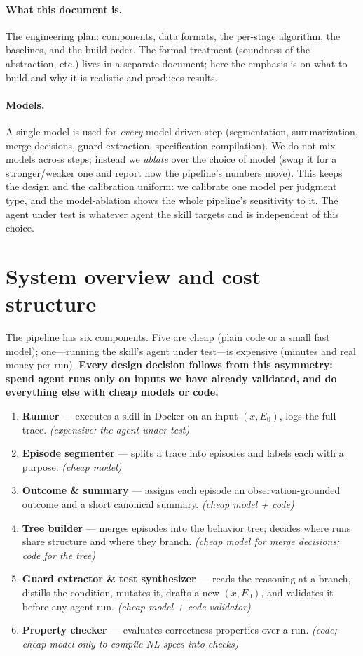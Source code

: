 \documentclass[11pt]{article}
\begin{document}
\paragraph{What this document is.} The engineering plan: components, data
formats, the per-stage algorithm, the baselines, and the build order. The formal
treatment (soundness of the abstraction, etc.) lives in a separate document; here
the emphasis is on what to build and why it is realistic and produces results.

\paragraph{Models.} A single model is used for \emph{every} model-driven step
(segmentation, summarization, merge decisions, guard extraction, specification
compilation). We do not mix models across steps; instead we \emph{ablate} over
the choice of model (swap it for a stronger/weaker one and report how the
pipeline's numbers move). This keeps the design and the calibration uniform: we
calibrate one model per judgment type, and the model-ablation shows the whole
pipeline's sensitivity to it. The agent under test is whatever agent the skill
targets and is independent of this choice.

\section{System overview and cost structure}

The pipeline has six components. Five are cheap (plain code or a small fast
model); one---running the skill's agent under test---is expensive (minutes and
real money per run). \textbf{Every design decision follows from this asymmetry:
spend agent runs only on inputs we have already validated, and do everything else
with cheap models or code.}

\begin{enumerate}[leftmargin=1.5em, itemsep=2pt]
  \item \textbf{Runner} --- executes a skill in Docker on an input $(x, E_0)$,
  logs the full trace. \emph{(expensive: the agent under test)}
  \item \textbf{Episode segmenter} --- splits a trace into episodes and labels
  each with a purpose. \emph{(cheap model)}
  \item \textbf{Outcome \& summary} --- assigns each episode an
  observation-grounded outcome and a short canonical summary. \emph{(cheap model
  + code)}
  \item \textbf{Tree builder} --- merges episodes into the behavior tree;
  decides where runs share structure and where they branch. \emph{(cheap model
  for merge decisions; code for the tree)}
  \item \textbf{Guard extractor \& test synthesizer} --- reads the reasoning at
  a branch, distills the condition, mutates it, drafts a new $(x, E_0)$, and
  validates it before any agent run. \emph{(cheap model + code validator)}
  \item \textbf{Property checker} --- evaluates correctness properties over a
  run. \emph{(code; cheap model only to compile NL specs into checks)}
\end{enumerate}
\end{document}
